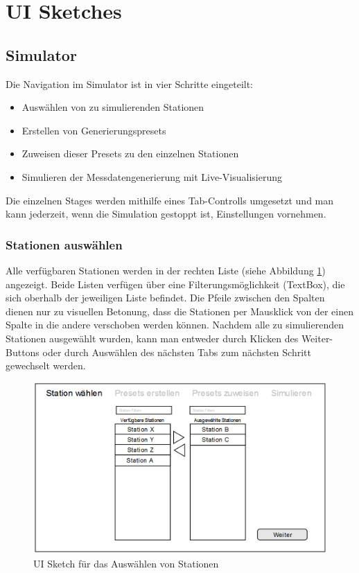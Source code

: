 \section{UI Sketches}
\setlength{\parindent}{0ex}
\subsection{Simulator}

Die Navigation im Simulator ist in vier Schritte eingeteilt:
\begin{itemize}
    \item Auswählen von zu simulierenden Stationen
    \item Erstellen von Generierungspresets
    \item Zuweisen dieser Presets zu den einzelnen Stationen
    \item Simulieren der Messdatengenerierung mit Live-Visualisierung
\end{itemize}

Die einzelnen Stages werden mithilfe eines Tab-Controlls umgesetzt und man kann jederzeit, wenn die Simulation gestoppt ist, Einstellungen vornehmen.

\subsubsection{Stationen auswählen}

Alle verfügbaren Stationen werden in der rechten Liste (siehe Abbildung \ref{fig:sketch_select_station}) angezeigt. 
Beide Listen verfügen über eine Filterungsmöglichkeit (TextBox), die sich oberhalb der jeweiligen Liste befindet.
Die Pfeile zwischen den Spalten dienen nur zu visuellen Betonung, dass die Stationen per Mausklick von der einen Spalte in die andere verschoben werden können. Nachdem alle zu simulierenden Stationen ausgewählt wurden, kann man entweder durch Klicken des \grqq Weiter\glqq-Buttons oder durch Auswählen des nächsten Tabs zum nächsten Schritt gewechselt werden.

\begin{figure}[H]
\centering
\includegraphics[width=1\textwidth]{pictures/sketches/simulator/select_sataion.png}
\caption{UI Sketch für das Auswählen von Stationen}
\label{fig:sketch_select_station}
\end{figure}
\raggedright

